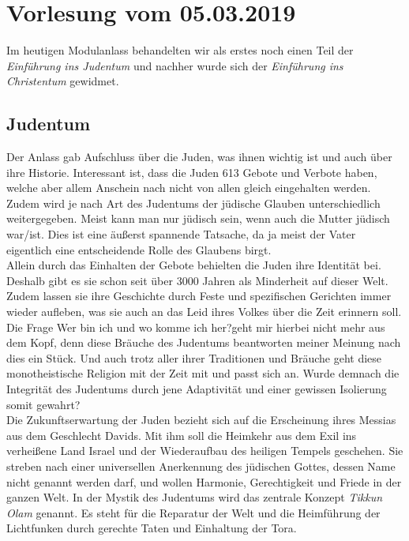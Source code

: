 \section{Vorlesung vom 05.03.2019}
Im heutigen Modulanlass behandelten wir als erstes noch einen Teil der \textit{Einführung ins Judentum} und nachher wurde sich der \textit{Einführung ins Christentum} gewidmet. \\

\subsection*{Judentum}
Der Anlass gab Aufschluss über die Juden, was ihnen wichtig ist und auch über ihre Historie. Interessant ist, dass die Juden 613 Gebote und Verbote haben, welche aber allem Anschein nach nicht von allen gleich eingehalten werden. Zudem wird je nach Art des Judentums der jüdische Glauben unterschiedlich weitergegeben. Meist kann man nur jüdisch sein, wenn auch die Mutter jüdisch war/ist. Dies ist eine äußerst spannende Tatsache, da ja meist der Vater eigentlich eine entscheidende Rolle des Glaubens birgt.\\

Allein durch das Einhalten der Gebote behielten die Juden ihre Identität bei. Deshalb gibt es sie schon seit über 3000 Jahren als Minderheit auf dieser Welt. Zudem lassen sie ihre Geschichte durch Feste und spezifischen Gerichten immer wieder aufleben, was sie auch an das Leid ihres Volkes über die Zeit erinnern soll. Die Frage \glqq Wer bin ich und wo komme ich her?\grqq geht mir hierbei nicht mehr aus dem Kopf, denn diese Bräuche des Judentums beantworten meiner Meinung nach dies ein Stück. Und auch trotz aller ihrer Traditionen und Bräuche geht diese monotheistische Religion mit der Zeit mit und passt sich an. Wurde demnach die Integrität des Judentums durch jene Adaptivität und einer gewissen Isolierung somit gewahrt?\\

Die Zukunftserwartung der Juden bezieht sich auf die Erscheinung ihres Messias aus dem Geschlecht Davids. Mit ihm soll die Heimkehr aus dem Exil ins verheißene Land Israel und der Wiederaufbau des heiligen Tempels geschehen. Sie streben nach einer universellen Anerkennung des jüdischen Gottes, dessen Name nicht genannt werden darf, und wollen Harmonie, Gerechtigkeit und Friede in der ganzen Welt. In der Mystik des Judentums wird das zentrale Konzept \textit{Tikkun Olam} genannt. Es steht für die Reparatur der Welt und die Heimführung der Lichtfunken durch gerechte Taten und Einhaltung der Tora.\\

